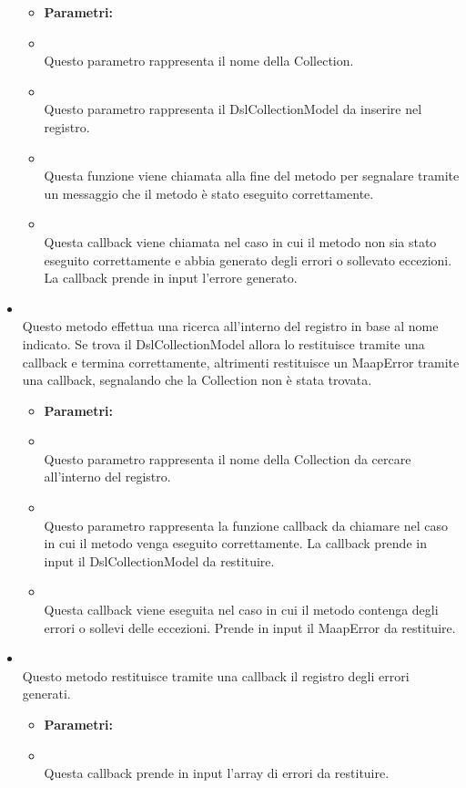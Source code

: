 \begin{itemize}
\begin{itemize}\addtolength{\itemsep}{-0.5\baselineskip}
\item[] \textbf{Parametri:}
\item[]  \\ Questo parametro rappresenta il nome della Collection.
\item[]  \\ Questo parametro rappresenta il DslCollectionModel da inserire nel registro.
\item[]  \\ Questa funzione viene chiamata alla fine del metodo per segnalare tramite un messaggio che il metodo è stato eseguito correttamente.
\item[]  \\ Questa callback viene chiamata nel caso in cui il metodo non sia stato eseguito correttamente e abbia generato degli errori o sollevato eccezioni. La callback prende in input l'errore generato.
\end{itemize}
\item[] \textbf{} \\ Questo metodo effettua una ricerca all'interno del registro in base al nome indicato. Se trova il DslCollectionModel allora lo restituisce tramite una callback e termina correttamente, altrimenti restituisce un MaapError tramite una callback, segnalando che la Collection non è stata trovata.
\begin{itemize}\addtolength{\itemsep}{-0.5\baselineskip}
\item[] \textbf{Parametri:}
\item[]  \\ Questo parametro rappresenta il nome della Collection da cercare all'interno del registro.
\item[]  \\ Questo parametro rappresenta la funzione callback da chiamare nel caso in cui il metodo venga eseguito correttamente. La callback prende in input il DslCollectionModel da restituire.
\item[]  \\ Questa callback viene eseguita nel caso in cui il metodo contenga degli errori o sollevi delle eccezioni. Prende in input il MaapError da restituire.
\end{itemize}
\item[] \textbf{} \\ Questo metodo restituisce tramite una callback il registro degli errori generati.
\begin{itemize}\addtolength{\itemsep}{-0.5\baselineskip}
\item[] \textbf{Parametri:}
\item[]  \\ Questa callback prende in input l'array di errori da restituire.
\end{itemize}
\end{itemize}


